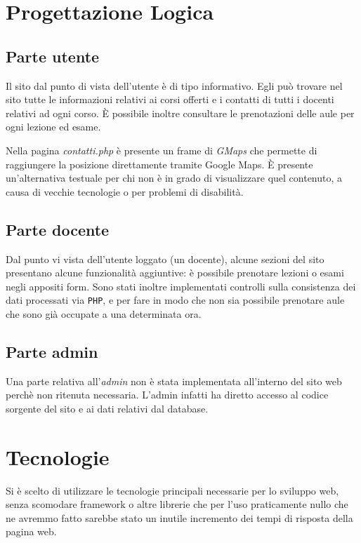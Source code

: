 \documentclass[12pt, a4paper]{article}
\newcommand*{\egrave}{\MakeUppercase{è} }
\begin{document}
\pagebreak

\section{Progettazione Logica}

\subsection{Parte utente}
Il sito dal punto di vista dell'utente è di tipo informativo. Egli può trovare nel sito
tutte le informazioni relativi ai corsi offerti e i contatti di tutti i docenti relativi
ad ogni corso. \egrave possibile inoltre consultare le prenotazioni delle aule per ogni
lezione ed esame.\par
Nella pagina \textit{contatti.php} è presente un frame di \emph{GMaps} che permette di 
raggiungere la posizione direttamente tramite Google Maps. \egrave presente un'alternativa 
testuale per chi non è in grado di visualizzare quel contenuto, a causa di vecchie tecnologie
o per problemi di disabilità.

\subsection{Parte docente}
Dal punto vi vista dell'utente loggato (un docente), alcune sezioni del sito
presentano alcune funzionalità aggiuntive: è possibile prenotare lezioni o esami negli 
appositi form. Sono stati inoltre implementati controlli sulla consistenza dei dati
processati via \texttt{PHP}, e per fare in modo che non sia possibile prenotare aule che sono già 
occupate a una determinata ora. \par

\subsection{Parte admin}
Una parte relativa all'\emph{admin} non è stata implementata all'interno del sito web 
perchè non ritenuta necessaria. L'admin infatti ha diretto accesso al codice sorgente
del sito e ai dati relativi dal database.

\section{Tecnologie}
Si è scelto di utilizzare le tecnologie principali necessarie per lo sviluppo web, senza
scomodare framework o altre librerie che per l'uso praticamente nullo che ne avremmo fatto
sarebbe stato un inutile incremento dei tempi di risposta della pagina web.
\end{document}
